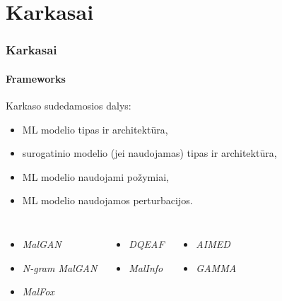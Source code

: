 \documentclass[12pt]{beamer}
\begin{document}
\section{Karkasai}
\begin{frame}
    \frametitle{Karkasai}
    \framesubtitle{Frameworks}
    Karkaso sudedamosios dalys:\pause
    \begin{itemize}
        \item ML modelio tipas ir architektūra, \pause
        \item surogatinio modelio (jei naudojamas) tipas ir architektūra, \pause
        \item ML modelio naudojami požymiai, \pause
        \item ML modelio naudojamos perturbacijos.
    \end{itemize}\pause
    \vspace{20pt}
    \begin{columns}[t]
        \vspace{10pt}
        \begin{itemize}
            \item \textit{MalGAN}
            \item \textit{N-gram MalGAN}
            \item \textit{MalFox}
        \end{itemize}\pause
        \vspace{10pt}
        \begin{itemize}
            \item \textit{DQEAF}
            \item \textit{MalInfo}
        \end{itemize}\pause
        \vspace{10pt}
        \begin{itemize}
            \item \textit{AIMED}
            \item \textit{GAMMA}
        \end{itemize}
    \end{columns}
\end{frame}
\end{document}
